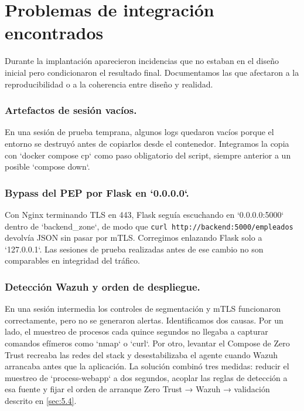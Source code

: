\documentclass[11pt,spanish,listoffigures,listoftables]{tfgetsinf}
\begin{document}
    \section{Problemas de integración encontrados}
    Durante la implantación aparecieron incidencias que no estaban en el diseño inicial pero condicionaron el resultado final. Documentamos las que afectaron a la reproducibilidad o a la coherencia entre diseño y realidad.
    
    \subsubsection{Artefactos de sesión vacíos.} 
    En una sesión de prueba temprana, algunos logs quedaron vacíos porque el entorno se destruyó antes de copiarlos desde el contenedor. Integramos la copia con `docker compose cp` como paso obligatorio del script, siempre anterior a un posible `compose down`.
    
    \subsubsection{Bypass del PEP por Flask en `0.0.0.0`.} 
    Con Nginx terminando TLS en 443, Flask seguía escuchando en `0.0.0.0:5000` dentro de `backend\_zone`, de modo que \texttt{curl http://backend:5000/empleados} devolvía JSON sin pasar por mTLS. Corregimos enlazando Flask solo a `127.0.0.1`. Las sesiones de prueba realizadas antes de ese cambio no son comparables en integridad del tráfico.
    
    \subsubsection{Detección Wazuh y orden de despliegue.}
    En una sesión intermedia los controles de segmentación y mTLS funcionaron correctamente, pero no se generaron alertas. Identificamos dos causas. Por un lado, el muestreo de procesos cada quince segundos no llegaba a capturar comandos efímeros como `nmap` o `curl`. Por otro, levantar el Compose de Zero Trust recreaba las redes del stack y desestabilizaba el agente cuando Wazuh arrancaba antes que la aplicación.     La solución combinó tres medidas: reducir el muestreo de `process-webapp` a dos segundos, acoplar las reglas de detección a esa fuente y fijar el orden de arranque Zero Trust → Wazuh → validación descrito en \cref{sec:5.4}.
    
\end{document}
